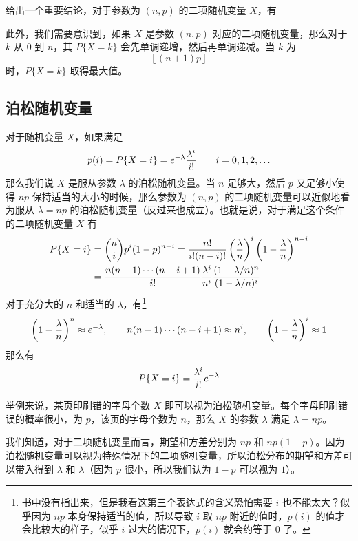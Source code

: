 \documentclass[utf8,a4paper,nofonts,9pt]{ctexbook}
\begin{document}
给出一个重要结论，对于参数为 $(n, p)$ 的二项随机变量 $X$，有
\begin{center}
\end{center}

此外，我们需要意识到，如果 $X$ 是参数 $(n, p)$ 对应的二项随机变量，那么对于 $k$ 从 $0$ 到 $n$，其 $P\{ X = k \}$ 会先单调递增，然后再单调递减。当 $k$ 为
\[
    \left\lfloor (n + 1) p \right\rfloor
\]
时，$P\{X = k\}$ 取得最大值。


\subsection{泊松随机变量}

对于随机变量 $X$，如果满足
\[
    p(i) = P\{X = i\} = e^{-\lambda} {\lambda^i \over i!} \qquad i = 0, 1, 2, \ldots
\]
那么我们说 $X$ 是服从参数 $\lambda$ 的泊松随机变量。当 $n$ 足够大，然后 $p$ 又足够小使得 $np$ 保持适当的大小的时候，那么参数为 $(n, p)$ 的二项随机变量可以近似地看为服从 $\lambda = np$ 的泊松随机变量（反过来也成立）。也就是说，对于满足这个条件的二项随机变量 $X$ 有
\begin{align*}
    P\{X = i\} & = {n \choose i} p^i (1 - p)^{n - i} = {n! \over i! (n - i)!} \left( {\lambda \over n} \right)^i \left( 1 - {\lambda \over n} \right)^{n - i} \\
               & = {n (n - 1) \cdots (n - i + 1) \over i!} {\lambda^i \over n^i} {(1 - \lambda / n)^n \over (1 - \lambda / n)^i}
\end{align*}
对于充分大的 $n$ 和适当的 $\lambda$，有\footnote{书中没有指出来，但是我看这第三个表达式的含义恐怕需要 $i$ 也不能太大？似乎因为 $np$ 本身保持适当的值，所以导致 $i$ 取 $np$ 附近的值时，$p(i)$ 的值才会比较大的样子，似乎 $i$ 过大的情况下，$p(i)$ 就会约等于 $0$ 了。}
\[
    \left(1 - {\lambda \over n}\right)^n \approx e^{-\lambda}, \qquad n (n - 1) \cdots (n - i + 1) \approx n^i, \qquad \left(1 - {\lambda \over n}\right)^i \approx 1
\]
那么有
\[
    P\{X = i\} = {\lambda^i \over i!} e^{-\lambda}
\]

举例来说，某页印刷错的字母个数 $X$ 即可以视为泊松随机变量。每个字母印刷错误的概率很小，为 $p$，该页的字母个数为 $n$，那么 $X$ 的参数 $\lambda$ 满足 $\lambda = np$。

我们知道，对于二项随机变量而言，期望和方差分别为 $np$ 和 $np(1 - p)$。因为泊松随机变量可以视为特殊情况下的二项随机变量，所以泊松分布的期望和方差可以带入得到 $\lambda$ 和 $\lambda$（因为 $p$ 很小，所以我们认为 $1 - p$ 可以视为 $1$）。
\end{document}
